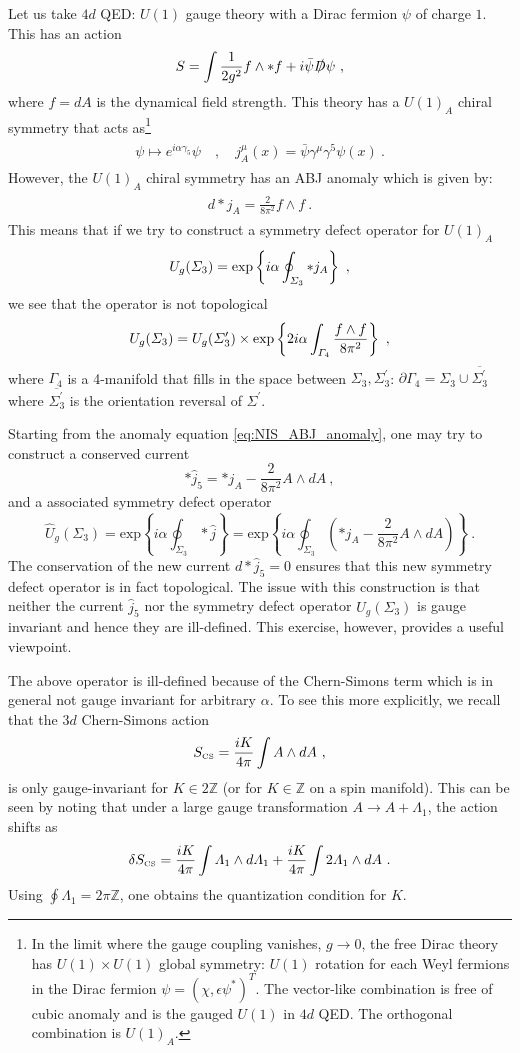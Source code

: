 \documentclass[11pt]{article}
\newcommand{\eq}[1]{\begin{align}\begin{split}#1\end{split}\end{align}}
\def\IZ{{\mathbb{Z}}}
\def\beq{\begin{equation}}
\def\eeq{\end{equation}}
\begin{document}
Let us take $4d$ QED: $U(1)$ gauge theory with a Dirac fermion $\psi$ of charge $1$. This has an action
\eq{\label{CANonTop}
S=\int \frac{1}{2g^2}f\wedge \ast f+i \bar\psi \slashed{D}\psi~,
}
%
where $f = dA$ is the dynamical field strength. 
This theory has a $U(1)_A$ chiral symmetry that acts as\footnote{In the limit where the gauge coupling vanishes, $g \to 0$, the free Dirac theory has $U(1) \times U(1)$ global symmetry: $U(1)$ rotation for each Weyl fermions in the Dirac fermion $\psi = (\chi, \epsilon \psi^*)^T$. The vector-like combination is free of cubic anomaly and is the gauged $U(1)$ in $4d$ QED. The orthogonal combination is $U(1)_A$.}
%
\eq{
\psi\longmapsto e^{ i \alpha \gamma_5}\psi\quad, \quad j_A^\mu(x)=\bar\psi \gamma^\mu \gamma^5\psi(x)~.
}
However, the $U(1)_A$ chiral symmetry has an ABJ anomaly which is given by: 
\eq{\label{eq:NIS_ABJ_anomaly}
d\ast j_A=\frac{2}{8\pi^2}f\wedge f~.
}
This means that if we try to construct a symmetry defect operator for $U(1)_A$
\eq{\label{eq:NIS_naive_SDO}
U_g(\Sigma_3)={\rm exp}\left\{i \alpha \oint_{\Sigma_3} \ast j_A\right\}~,
}
we see that the operator is not topological 
\eq{\label{NISDOphase}
U_g(\Sigma_3)=U_g(\Sigma_3^\prime)\times {\rm exp}\left\{2i \alpha \int_{\Gamma_4} \frac{f\wedge f}{8\pi^2}\right\}~,
}
where $\Gamma_4$ is a 4-manifold that fills in the space between $\Sigma_3,\Sigma_3^\prime$: $\partial \Gamma_4=\Sigma_3\cup \overline{\Sigma_3^{\prime}}$ where $\overline{\Sigma_3^{\prime}}$ is the orientation reversal of $\Sigma^\prime$. 

Starting from the anomaly equation \eqref{eq:NIS_ABJ_anomaly}, one may try to construct a conserved current 
%
\beq
* \widehat{j}_5 = * j_A - \frac{2}{8\pi^2} A \wedge d A~,
\eeq
%
and a associated symmetry defect operator
%
\beq\label{SDOattempt}
\widehat{U}_g (\Sigma_3) = \text{exp} \left\lbrace i \alpha \oint_{\Sigma_3} \ast \widehat{j} \right\rbrace= \text{exp} \left\lbrace i \alpha \oint_{\Sigma_3} \left(\ast j_A - \frac{2}{8\pi^2} A \wedge d A\right) \right\rbrace~.
\eeq
%
The conservation of the new current $d * \widehat{j}_5 = 0$ ensures that this new symmetry defect operator is in fact topological. The issue with this construction is that neither the current $\widehat{j}_5$ nor the symmetry defect operator $\widehat{U}_g (\Sigma_3) $ is gauge invariant and hence they are ill-defined. This exercise, however, provides a useful viewpoint. 

The above operator is ill-defined because  of the Chern-Simons term which is in general not gauge invariant for arbitrary $\alpha$. To see this more explicitly, we recall that the $3d$ Chern-Simons action
%
\beq
S_{\rm \scriptscriptstyle CS} = \frac{iK}{4\pi} \int A \wedge dA~,
\eeq
%
is only gauge-invariant for $K \in 2 \IZ$ (or for $K \in \IZ$ on a spin manifold). This can be seen by noting that under a large gauge transformation $A \to A + \Lambda_1$, the action shifts as
%
\beq
\delta S_{\rm \scriptscriptstyle CS} = \frac{iK}{4\pi} \int \Lambda_1 \wedge d \Lambda_1 + \frac{iK}{4\pi} \int 2 \Lambda_1 \wedge d A~.
\eeq
%
Using $\oint \Lambda_1 = 2\pi \IZ$, one obtains the quantization condition for $K$. 
\end{document}
